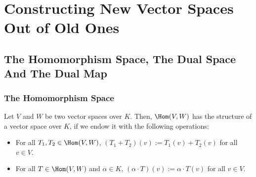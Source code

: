\renewcommand{\thetheorem}{18.a.\arabic{theorem}}
\setcounter{theorem}{0}
\setcounter{chapter}{17} %

\chapter{Constructing New Vector Spaces Out of Old Ones}


\setcounter{section}{0}
\section{The Homomorphism Space, The Dual Space And The Dual Map}

\subsection{The Homomorphism Space}

\begin{proposition}
  \label{prop:hom_vector_space}
  Let $V$ and $W$ be two vector spaces over $K$. Then, $\Hom(V,W)$ has the structure of a vector space over $K$, if we endow it with the following operations:
  \begin{itemize}
    \item For all $T_1, T_2 \in \Hom(V,W)$, $(T_1 + T_2)(v) := T_1(v) + T_2(v)$ for all $v \in V$.
    \item For all $T \in \Hom(V,W)$ and $\alpha \in K$, $(\alpha \cdot T)(v) := \alpha \cdot T(v)$ for all $v \in V$.
  \end{itemize}
\end{proposition} 

